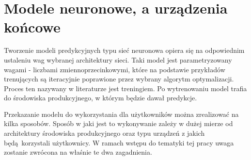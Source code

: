 \newpage
\section[general]{Modele neuronowe, a urządzenia końcowe}\label{sec:general}

Tworzenie modeli predykcyjnych typu sieć neuronowa opiera się na odpowiednim ustaleniu wag
wybranej architektury sieci. Taki model jest parametryzowany wagami - liczbami
zmiennoprzecinkowymi, które na podstawie przykładów trenujących są iteracyjnie poprawione przez
wybrany algorytm optymalizacji. Proces ten nazywany w literaturze jest treningiem. Po wytrenowaniu model trafia do środowiska produkcyjnego, w którym będzie dawał predykcje.

Przekazanie modelu do wykorzystania dla użytkowników można zrealizować na kilka sposobów. Sposób w jaki jest to wykonywanie zależy w dużej mierze od architektury środowiska produkcyjnego oraz typu urządzeń z jakich będą korzystali użytkownicy. W ramach wstępu do tematyki tej pracy uwaga zostanie zwrócona na właśnie te dwa zagadnienia.

